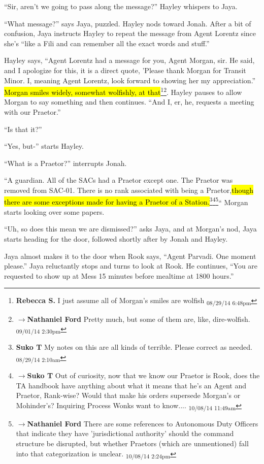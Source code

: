 ``Sir, aren't we going to pass along the message?'' Hayley whispers to Jaya.

``What message?'' says Jaya, puzzled.  Hayley nods toward Jonah.  After a bit of confusion, Jaya instructs Hayley to repeat the message from Agent Lorentz since she's ``like a Fili and can remember all the exact words and stuff.''

Hayley says, ``Agent Lorentz had a message for you, Agent Morgan, sir.  He said, and I apologize for this, it is a direct quote, 'Please thank Morgan for Transit Minor.  I, meaning Agent Lorentz, look forward to showing her my appreciation.'' \hl{Morgan smiles widely, somewhat wolfishly, at that}\footnote{\textbf{Rebecca S. }I just assume all of Morgan's smiles are wolfish \textsubscript{08/29/14 6:48pm}}\footnote{$\rightarrow$\textbf{Nathaniel Ford }Pretty much, but some of them are, like, dire-wolfish. \textsubscript{09/01/14 2:30pm}}.   Hayley pauses to allow Morgan to say something and then continues.  ``And I, er, he, requests a meeting with our Praetor.''

``Is that it?''

``Yes, but-'' starts Hayley.

``What is a Praetor?'' interrupts Jonah.

``A guardian.  All of the SACs had a Praetor except one.  The Praetor was removed from SAC-01.  There is no rank associated with being a Praetor,\hl{though there are some exceptions made for having a Praetor of a Station.}\footnote{\textbf{Suko T }My notes on this are all kinds of terrible.  Please correct as needed. \textsubscript{08/29/14 2:10am}}\footnote{$\rightarrow$\textbf{Suko T }Out of curiosity, now that we know our Praetor is Rook, does the TA handbook have anything about what it means that he's an Agent and Praetor, Rank-wise?  Would that make his orders supersede Morgan's or Mohinder's?   Inquiring Process Wonks want to know.... \textsubscript{10/08/14 11:49am}}\footnote{$\rightarrow$\textbf{Nathaniel Ford }There are some references to Autonomous Duty Officers that indicate they have 'jurisdictional authority' should the command structure be disrupted, but whether Praetors (which are unmentioned) fall into that categorization is unclear. \textsubscript{10/08/14 2:24pm}}``  Morgan starts looking over some papers.

``Uh, so does this mean we are dismissed?'' asks Jaya, and at Morgan's nod, Jaya starts heading for the door, followed shortly after by Jonah and Hayley.  

Jaya almost makes it to the door when Rook says, ``Agent Parvadi.  One moment please.''  Jaya reluctantly stops and turns to look at Rook.  He continues, ``You are requested to show up at Mess 15 minutes before mealtime at 1800 hours.''

